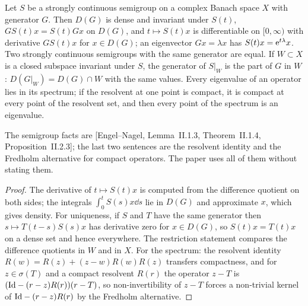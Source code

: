 \begin{lemma}
  \label{lem:dynamics:generator-basic}
  \leanok
  Let $S$ be a strongly continuous semigroup on a complex Banach space $X$ with generator $G$.
  Then $D(G)$ is dense and invariant under $S(t)$, $GS(t)x=S(t)Gx$ on $D(G)$, and
  $t\mapsto S(t)x$ is differentiable on $[0,\infty)$ with derivative $GS(t)x$ for $x\in D(G)$;
  an eigenvector $Gx=\lambda x$ has $S(t)x=\mathrm{e}^{t\lambda}x$.  Two strongly continuous semigroups
  with the same generator are equal.  If $W\subset X$ is a closed subspace invariant under
  $S$, the generator of $S|_W$ is the part of $G$ in $W$: $D(G|_W)=D(G)\cap W$ with the same
  values.  Every eigenvalue of an operator lies in its spectrum; if the resolvent at one point
  is compact, it is compact at every point of the resolvent set, and then every point of the
  spectrum is an eigenvalue.
\end{lemma}

The semigroup facts are [Engel--Nagel, Lemma~II.1.3, Theorem~II.1.4, Proposition~II.2.3]; the
last two sentences are the resolvent identity and the Fredholm alternative for compact
operators.  The paper uses all of them without stating them.

\begin{proof}
  \leanok
  The derivative of $t\mapsto S(t)x$ is computed from the difference quotient on both sides;
  the integrals $\int_0^tS(s)x\dd s$ lie in $D(G)$ and approximate $x$, which gives density.
  For uniqueness, if $S$ and $T$ have the same generator then
  $s\mapsto T(t-s)S(s)x$ has derivative zero for $x\in D(G)$, so $S(t)x=T(t)x$ on a dense set
  and hence everywhere.  The restriction statement compares the difference quotients in $W$
  and in $X$.  For the spectrum: the resolvent identity
  $R(w)=R(z)+(z-w)R(w)R(z)$ transfers compactness, and for $z\in\sigma(T)$ and a compact
  resolvent $R(r)$ the operator $z-T$ is $(\mathrm{Id}-(r-z)R(r))(r-T)$, so non-invertibility of
  $z-T$ forces a non-trivial kernel of $\mathrm{Id}-(r-z)R(r)$ by the Fredholm alternative.
\end{proof}

